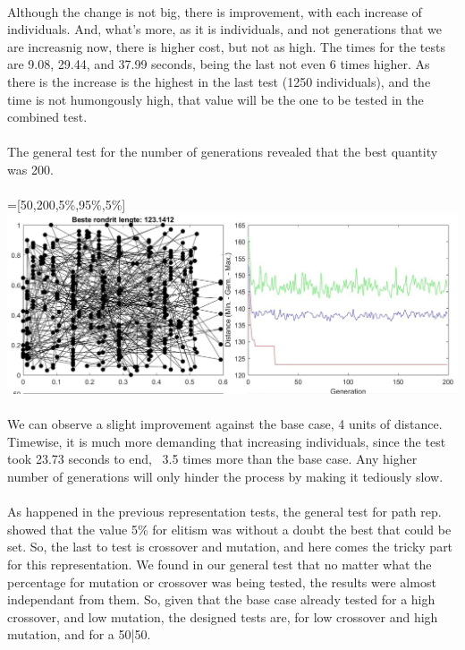 \\
Although the change is not big, there is improvement, with each increase
of individuals. And, what's more, as it is individuals, and not
generations that we are increasnig now, there is higher cost, but not as high.
The times for the tests are 9.08, 29.44, and 37.99 seconds, being the last not
even 6 times higher. As there is the increase is the highest in the last
test (1250 individuals), and the time is not humongously high, that value
will be the one to be tested in the combined test.\\ 
\\
The general test for the number of generations revealed that the best quantity
was 200.\\
\\
 =[50,200,5\%,95\%,5\%]\\
\includegraphics[width=\textwidth]{img/specific/order_crossover/general_5.jpg}\\
\\
We can observe a slight improvement against the base case, 4 units of
distance. Timewise, it is much more demanding that increasing
individuals, since the test took 23.73 seconds to end, ~3.5 times more than the
base case. Any higher number of generations will only hinder the process
by making it tediously slow.\\
\\
As happened in the previous representation tests, the general test for path
rep. showed that the value 5\% for elitism was without a doubt the best that
could be set. So, the last to test is crossover and mutation, and here comes the tricky part for this representation. We found in our general
test that no matter what the percentage for mutation or crossover was being
tested, the results were almost independant from them. So, given that the base
case already tested for a high crossover, and low mutation, the designed
tests are, for low crossover and high mutation, and for a 50|50. \\
